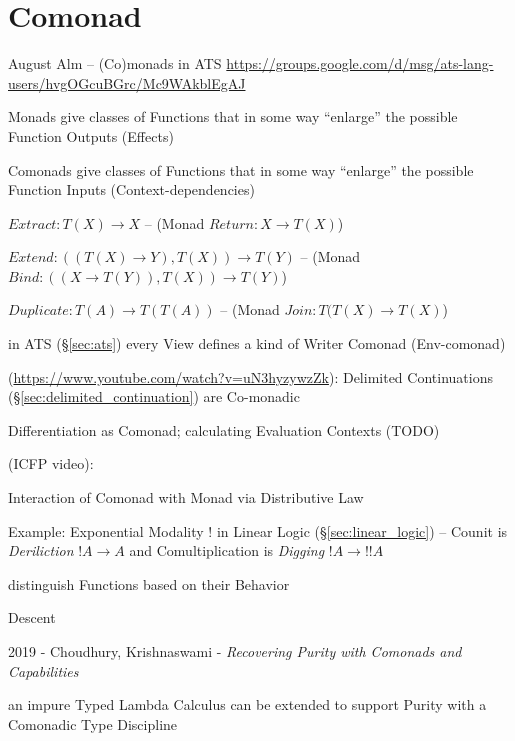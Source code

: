\section{Comonad}\label{sec:comonad}

\asterism


August Alm -- (Co)monads in ATS
\url{https://groups.google.com/d/msg/ats-lang-users/hvgOGcuBGrc/Mc9WAkblEgAJ}

Monads give classes of Functions that in some way ``enlarge'' the possible
Function Outputs (Effects)

Comonads give classes of Functions that in some way ``enlarge'' the possible
Function Inputs (Context-dependencies)

$Extract : T(X) \rightarrow X$ -- (Monad $Return : X \rightarrow T(X)$)

$Extend : ((T(X) \rightarrow Y), T(X)) \rightarrow T(Y)$ -- (Monad
$Bind : ((X \rightarrow T(Y)), T(X)) \rightarrow T(Y)$)

$Duplicate : T(A) \rightarrow T(T(A))$ -- (Monad
$Join : T(T(X) \rightarrow T(X)$)

in ATS (\S\ref{sec:ats}) every View defines a kind of Writer Comonad
(Env-comonad)

(\url{https://www.youtube.com/watch?v=uN3hyzywzZk}): Delimited Continuations
(\S\ref{sec:delimited_continuation}) are Co-monadic

Differentiation as Comonad; calculating Evaluation Contexts (TODO)


\asterism


(ICFP video):

Interaction of Comonad with Monad via Distributive Law %

Example: Exponential Modality $!$ in Linear Logic
(\S\ref{sec:linear_logic}) -- Counit is \emph{Deriliction} $!A
\rightarrow A$ and Comultiplication is \emph{Digging} $!A \rightarrow
!!A$

distinguish Functions based on their Behavior

Descent

\asterism

2019 - Choudhury, Krishnaswami -
\emph{Recovering Purity with Comonads and Capabilities}

an impure Typed Lambda Calculus can be extended to support Purity with a
Comonadic Type Discipline



